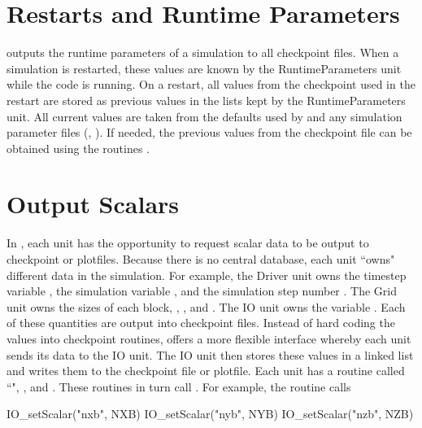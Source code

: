 

\section{Restarts and Runtime Parameters}\label{Sec:runtime parameters}

\flashx outputs the runtime parameters of a simulation to all checkpoint files.
When a simulation is restarted, these values are known by the \unit{RuntimeParameters} unit while
the code is running.  On a restart, all values from the checkpoint used in the
restart are stored as previous values in the lists kept by the
\unit{RuntimeParameters} unit.  All current values are taken from the
defaults used by \flashx and any simulation parameter files (\eg, ).  If needed, the previous
values from the checkpoint file can be obtained using the routines 
.

\section{Output Scalars}\label{Sec:output scalars}

In \flashx, each unit has the opportunity to request scalar data to be
output to checkpoint or plotfiles.  Because there is no central
database, each unit ``owns" different data in the
simulation. For example, the \unit{Driver} unit owns the timestep variable
, the simulation variable , and the simulation
step number .  The \unit{Grid} unit owns the sizes of each
block, , , and .  The \unit{IO} unit owns
the variable .  Each of these
quantities are output into checkpoint files. Instead of hard coding the values into
checkpoint routines, \flashx offers a more flexible interface whereby
each unit sends its data to the \unit{IO} unit.  The \unit{IO} unit then stores
these values in a linked list and writes them to the checkpoint file or
plotfile.  Each unit has a routine called ``", \eg,
 and
. These routines in turn call
.  For example, the routine
 calls

\begin{codeseg}
 IO_setScalar("nxb", NXB)
 IO_setScalar("nyb", NYB)
 IO_setScalar("nzb", NZB)
\end{codeseg}

